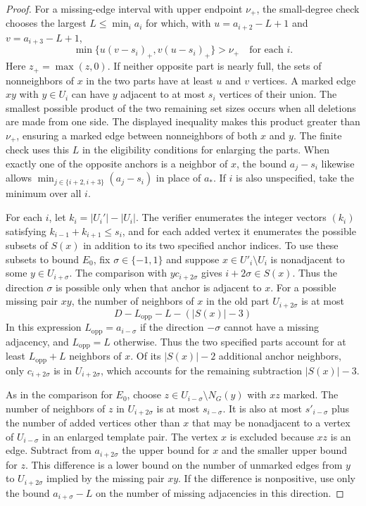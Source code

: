\documentclass[preprint,11pt,numbers]{elsarticle-arxiv}
\numberwithin{equation}{section}
\theoremstyle{definition}
\begin{document}
\begin{proof}
For a missing-edge interval with upper endpoint $\nu_+$, the small-degree
check chooses the largest $L\leq\min_i a_i$ for which, with
$u=a_{i+2}-L+1$ and $v=a_{i+3}-L+1$,
\[
 \min\{u(v-s_i)_+,v(u-s_i)_+\}>\nu_+\quad\text{for each }i .
\]
Here $z_+=\max(z,0)$. If neither opposite part is nearly full,
the sets of nonneighbors of $x$ in the two parts have at least
$u$ and $v$ vertices. A marked edge $xy$ with $y\in U_i$ can
have $y$ adjacent to at most $s_i$ vertices of their union.
The smallest possible product of the two remaining set sizes
occurs when all deletions are made from one side. The displayed
inequality makes this product greater than $\nu_+$, ensuring a
marked edge between nonneighbors of both $x$ and $y$. The finite
check uses this $L$ in the eligibility conditions for enlarging
the parts. When exactly one of the opposite anchors is a
neighbor of $x$, the bound $a_j-s_i$ likewise allows
$\min_{j\in\{i+2,i+3\}}(a_j-s_i)$ in place of $a_*$. If $i$
is also unspecified, take the minimum over all $i$.

For each $i$, let $k_i=|U_i'|-|U_i|$. The verifier
enumerates the integer vectors $(k_i)$ satisfying
$k_{i-1}+k_{i+1}\leq s_i$, and for each added vertex it
enumerates the possible subsets of $S(x)$ in addition to
its two specified anchor indices. To use these subsets
to bound $E_0$, fix $\sigma\in\{-1,1\}$ and suppose
$x\in U'_i\setminus U_i$ is nonadjacent to some
$y\in U_{i+\sigma}$. The comparison with
$yc_{i+2\sigma}$ gives $i+2\sigma\in S(x)$. Thus the
direction $\sigma$ is possible only when that anchor is
adjacent to $x$. For a possible missing pair $xy$, the
number of neighbors of $x$ in the old part
$U_{i+2\sigma}$ is at most
\[
 D-L_{\mathrm{opp}}-L-(|S(x)|-3)
\]
In this expression $L_{\mathrm{opp}}=a_{i-\sigma}$ if the
direction $-\sigma$ cannot have a missing adjacency, and
$L_{\mathrm{opp}}=L$ otherwise. Thus the two specified
parts account for at least $L_{\mathrm{opp}}+L$ neighbors
of $x$. Of its $|S(x)|-2$ additional anchor neighbors,
only $c_{i+2\sigma}$ is in $U_{i+2\sigma}$, which accounts
for the remaining subtraction $|S(x)|-3$.

As in the comparison for $E_0$, choose
$z\in U_{i-\sigma}\setminus N_G(y)$ with $xz$ marked.
The number of neighbors of $z$ in $U_{i+2\sigma}$ is at most
$s_{i-\sigma}$. It is also at most $s'_{i-\sigma}$ plus
the number of added vertices other than $x$ that may be
nonadjacent to a vertex of $U_{i-\sigma}$ in an enlarged
template pair. The vertex $x$ is excluded because $xz$
is an edge. Subtract from $a_{i+2\sigma}$ the upper bound
for $x$ and the smaller upper bound for $z$. This difference
is a lower bound on the number of unmarked edges from $y$
to $U_{i+2\sigma}$ implied by the missing pair $xy$. If the
difference is nonpositive, use only the bound $a_{i+\sigma}-L$
on the number of missing adjacencies in this direction.


\end{proof}
\end{document}

